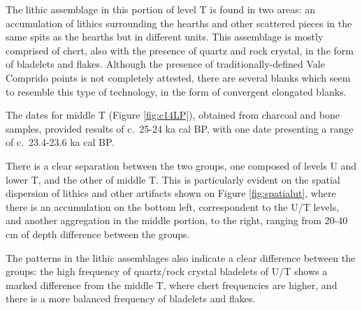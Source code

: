 \documentclass[12pt,twoside]{reedthesis}
\begin{document}
The lithic assemblage in this portion of level T is found in two areas: an accumulation of lithics surrounding the hearths and other scattered pieces in the same spits as the hearths but in different units. This assemblage is mostly comprised of chert, also with the presence of quartz and rock crystal, in the form of bladelets and flakes. Although the presence of traditionally-defined Vale Comprido points is not completely attested, there are several blanks which seem to resemble this type of technology, in the form of convergent elongated blanks.

The dates for middle T (Figure \ref{fig:c14LP}), obtained from charcoal and bone samples, provided results of c.~25-24 ka cal BP, with one date presenting a range of c.~23.4-23.6 ka cal BP.

There is a clear separation between the two groups, one composed of levels U and lower T, and the other of middle T. This is particularly evident on the spatial dispersion of lithics and other artifacts shown on Figure \ref{fig:spatialut}, where there is an accumulation on the bottom left, correspondent to the U/T levels, and another aggregation in the middle portion, to the right, ranging from 20-40 cm of depth difference between the groups.

The patterns in the lithic assemblages also indicate a clear difference between the groups: the high frequency of quartz/rock crystal bladelets of U/T shows a marked difference from the middle T, where chert frequencies are higher, and there is a more balanced frequency of bladelets and flakes.
\end{document}
